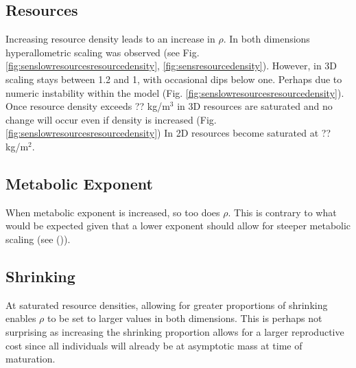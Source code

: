\documentclass[a4paper, 11pt, hidelinks]{article} %
\begin{document}
	\subsection{Resources}
	Increasing resource density leads to an increase in $\rho$.  In both dimensions hyperallometric scaling was observed (see Fig. \ref{fig:senslowresourcesresourcedensity}, \ref{fig:sensresourcedensity}).  However, in 3D scaling stays between 1.2 and 1, with occasional dips below one. Perhaps due to numeric instability within the model (Fig. \ref{fig:senslowresourcesresourcedensity}).  Once resource density exceeds ?? kg/m$^3$ in 3D resources are saturated and no change will occur even if density is increased (Fig. \ref{fig:senslowresourcesresourcedensity})
	In 2D resources become saturated at ?? kg/m$^2$. %
	
	\subsection{Metabolic Exponent}
	When metabolic exponent is increased, so too does $\rho$.  This is contrary to what would be expected given that a lower exponent should allow for steeper metabolic scaling (see \citeauthor{Marshall2019} (\citeyear{Marshall2019})).  %
	
	
	
	\subsection{Shrinking}
	At saturated resource densities, allowing for greater proportions of shrinking enables $\rho$ to be set to larger values in both dimensions.  This is perhaps not surprising as increasing the shrinking proportion allows for a larger reproductive cost since all individuals will already be at asymptotic mass at time of maturation.
	
\end{document}

